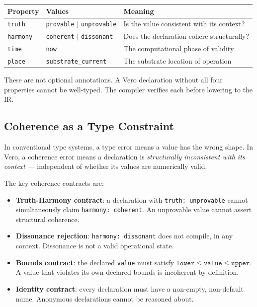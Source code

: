 \documentclass[11pt,a4paper]{article}
\begin{document}
\begin{center}
\begin{tabular}{lll}
\toprule
\textbf{Property} & \textbf{Values} & \textbf{Meaning} \\
\midrule
\texttt{truth}   & \texttt{provable} $\mid$ \texttt{unprovable} & Is the value consistent with its context? \\
\texttt{harmony} & \texttt{coherent} $\mid$ \texttt{dissonant}  & Does the declaration cohere structurally? \\
\texttt{time}    & \texttt{now}                                  & The computational phase of validity \\
\texttt{place}   & \texttt{substrate\_current}                   & The substrate location of operation \\
\bottomrule
\end{tabular}
\end{center}

These are not optional annotations. A Vero declaration without all four properties cannot
be well-typed. The compiler verifies each before lowering to the IR.

\subsection{Coherence as a Type Constraint}

In conventional type systems, a type error means a value has the wrong shape.
In Vero, a coherence error means a declaration is \emph{structurally inconsistent with its
context} --- independent of whether its values are numerically valid.

The key coherence contracts are:

\begin{itemize}
  \item \textbf{Truth-Harmony contract}: a declaration with \texttt{truth: unprovable} cannot
        simultaneously claim \texttt{harmony: coherent}. An unprovable value cannot assert
        structural coherence.
  \item \textbf{Dissonance rejection}: \texttt{harmony: dissonant} does not compile, in any
        context. Dissonance is not a valid operational state.
  \item \textbf{Bounds contract}: the declared \texttt{value} must satisfy
        $\texttt{lower} \leq \texttt{value} \leq \texttt{upper}$. A value that violates its
        own declared bounds is incoherent by definition.
  \item \textbf{Identity contract}: every declaration must have a non-empty, non-default name.
        Anonymous declarations cannot be reasoned about.
\end{itemize}
\end{document}

